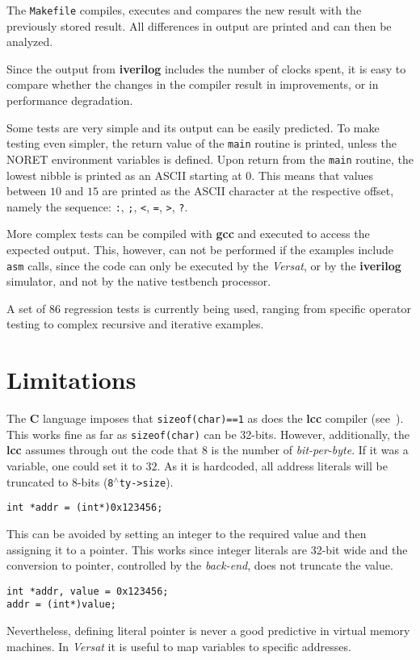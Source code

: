 The {\tt Makefile} compiles, executes and compares the new
result with the previously stored result.
All differences in output are printed and can then be analyzed.

Since the output from {\bf iverilog} includes the number
of clocks spent, it is easy to compare whether the changes in the
compiler result in improvements, or in performance degradation.

Some tests are very simple and its output can be easily predicted.
To make testing even simpler, the return value of the {\tt main}
routine is printed, unless the {\sc NORET} environment variables
is defined. Upon return from the {\tt main} routine, the lowest
nibble is printed as an {\sc ASCII} starting at $0$.
This means that values between $10$ and $15$ are printed as
the {\sc ASCII} character at the respective offset, namely the
sequence: \verb|:|, \verb|;|, \verb|<|, \verb|=|, \verb|>|, \verb|?|.

More complex tests can be compiled with {\bf gcc} and executed
to access the expected output.
This, however, can not be performed if the examples include
{\tt asm} calls, since the code can only be executed by the
{\it Versat}, or by the {\bf iverilog} simulator, and not by the
native testbench processor.

A set of $86$ regression tests is currently being used, ranging
from specific operator testing to complex recursive and iterative
examples. %

\section{Limitations}\label{limitations}

The {\bf C} language imposes that {\tt sizeof(char)==1}
as does the {\bf lcc} compiler (see~\cite[p.79]{hanson95}).
This works fine as far as {\tt sizeof(char)} can be 32-bits.
However, additionally, the {\bf lcc} assumes through out
the code that $8$ is the number of {\em bit-per-byte}.
If it was a variable, one could set it to $32$.
As it is hardcoded, all address literals
will be truncated to 8-bits ({\tt 8}${}^{\wedge}${\tt ty->size}).
\begin{verbatim}
int *addr = (int*)0x123456;
\end{verbatim}
This can be avoided by setting an integer to the
required value and then assigning it to a pointer.
This works since integer literals are 32-bit wide
and the conversion to pointer, controlled by the
{\it back-end}, does not truncate the value.
\begin{verbatim}
int *addr, value = 0x123456;
addr = (int*)value;
\end{verbatim}
Nevertheless, defining literal pointer is never
a good predictive in virtual memory machines.
In {\it Versat} it is useful to map variables
to specific addresses.

